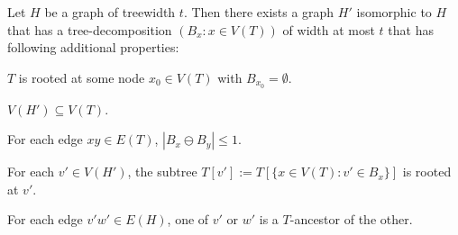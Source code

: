 \documentclass{patmorin}
\newcommand{\tlabel}[1]{\label{t:#1}}
\begin{document}
\begin{lem}
  Let $H$ be a graph of treewidth $t$.  Then there exists a graph $H'$ isomorphic to $H$ that has a tree-decomposition $(B_x:x\in V(T))$ of width at most $t$ that has following additional properties:  
  \begin{compactenum}[(T1)]
    \item\tlabel{rooted}\tlabel{first} $T$ is rooted at some node $x_0\in V(T)$ with $B_{x_0}=\emptyset$.
    \item\tlabel{node-set} $V(H')\subseteq V(T)$.
    \item\tlabel{diff} For each edge $xy\in E(T)$, $|B_x\ominus B_y|\le 1$.
    \item\tlabel{subtree-root} For each $v'\in V(H')$, the subtree $T[v']:=T[\{x\in V(T):v'\in B_x\}]$ is rooted at $v'$.
    \item\tlabel{ancestor-edge}\tlabel{last} For each edge $v'w'\in E(H)$, one of $v'$ or $w'$ is a $T$-ancestor of the other.
  \end{compactenum}
\end{lem}
\end{document}
